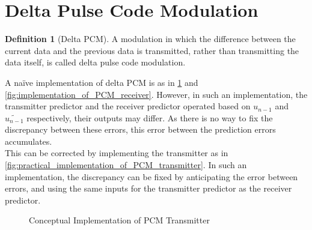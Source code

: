 \documentclass[titlepage, fleqn, a4paper, 12pt, twoside]{article}
\theoremstyle{definition}
\newtheorem{definition}{Definition}
\theoremstyle{theorem}
\renewcommand{\tilde}{\widetilde}
\renewcommand{\hat}{\widehat}
\begin{document}
\section{Delta Pulse Code Modulation}

\begin{definition}[Delta PCM]
	A modulation in which the difference between the current data and the previous data is transmitted, rather than transmitting the data itself, is called delta pulse code modulation.
\end{definition}

A naïve implementation of delta PCM is as in \cref{fig:conceptual_implementation_of_PCM_transmitter} and \cref{fig:implementation_of_PCM_receiver}.
However, in such an implementation, the transmitter predictor and the receiver predictor operated based on $u_{n - 1}$ and $\tilde{u_{n - 1}}$ respectively, their outputs may differ.
As there is no way to fix the discrepancy between these errors, this error between the prediction errors accumulates.\\
This can be corrected by implementing the transmitter as in \cref{fig:practical_implementation_of_PCM_transmitter}.
In such an implementation, the discrepancy can be fixed by anticipating the error between errors, and using the same inputs for the transmitter predictor as the receiver predictor.

\begin{figure}[H]
	\centering
	\begin{adjustbox}{max width = \textwidth}
	\end{adjustbox}
	\caption{Conceptual Implementation of PCM Transmitter}
	\label{fig:conceptual_implementation_of_PCM_transmitter}
\end{figure}
\end{document}
